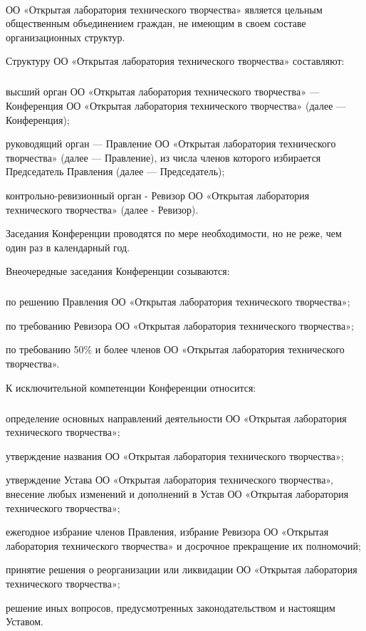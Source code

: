 \documentclass[a4paper,fontsize=14pt,titlepage]{scrartcl}
\makeatletter
\newenvironment{numberedpars}{%
  \addtocounter{secnumdepth}{1}
  \renewcommand\theparagraph{\arabic{section}.\arabic{paragraph}}
  \renewcommand\@seccntformat[1]
  {\expandafter\ifx\csname##1\endcsname\paragraph\csname 
  the##1\endcsname\else\csname the##1\endcsname\quad\fi}
  \let\old@par=\par
  \def\new@par{\let\par=\old@par\paragraph{}\let\par=\new@par}
  \let\par=\new@par
  \par
}{
  \addtocounter{secnumdepth}{-1}
}
\newenvironment{numberedsubpars}{%
  \addtocounter{secnumdepth}{1}
  \renewcommand\thesubparagraph{\arabic{section}.\arabic{paragraph}.\arabic{subparagraph}}
  \renewcommand\@seccntformat[1]
  {\expandafter\ifx\csname##1\endcsname\subparagraph\csname 
  the##1\endcsname\else\csname the##1\endcsname\quad\fi}
  \let\old@@par=\par
  \def\new@@par{\let\par=\old@par\subparagraph{}\let\par=\new@@par}
  \let\par=\new@@par
  \par
}{
  \addtocounter{secnumdepth}{-1}
  \let\par=\old@@par
}
\makeatother
\begin{document}
\begin{numberedpars}
ОО «Открытая лаборатория технического творчества» является цельным общественным объединением граждан, не имеющим в своем
составе организационных структур.

Структуру ОО «Открытая лаборатория технического творчества» составляют:
\begin{numberedsubpars}
высший орган ОО «Открытая лаборатория технического творчества» — Конференция ОО «Открытая лаборатория технического
творчества» (далее — Конференция);

руководящий орган — Правление ОО «Открытая лаборатория технического творчества» (далее — Правление), из числа членов
которого избирается Председатель Правления (далее — Председатель);

контрольно-ревизионный орган - Ревизор ОО «Открытая лаборатория технического творчества» (далее - Ревизор).
\end{numberedsubpars}

Заседания Конференции проводятся по мере необходимости, но не реже, чем один раз в календарный год.

Внеочередные заседания Конференции созываются:
\begin{numberedsubpars}
по решению Правления ОО «Открытая лаборатория технического творчества»;

по требованию Ревизора ОО «Открытая лаборатория технического творчества»;

по требованию 50\% и более членов ОО «Открытая лаборатория технического творчества».
\end{numberedsubpars}

К исключительной компетенции Конференции относится:
\begin{numberedsubpars}
определение основных направлений деятельности ОО «Открытая лаборатория технического творчества»;

утверждение названия ОО «Открытая лаборатория технического творчества»;

утверждение Устава ОО «Открытая лаборатория технического творчества», внесение любых изменений и дополнений в Устав ОО
«Открытая лаборатория технического творчества»;

ежегодное избрание членов Правления, избрание Ревизора ОО «Открытая лаборатория технического творчества» и досрочное
прекращение их полномочий;

принятие решения о реорганизации или ликвидации ОО «Открытая лаборатория технического творчества»;

решение иных вопросов, предусмотренных законодательством и настоящим Уставом.
\end{numberedsubpars}


\end{numberedpars}
\end{document}
